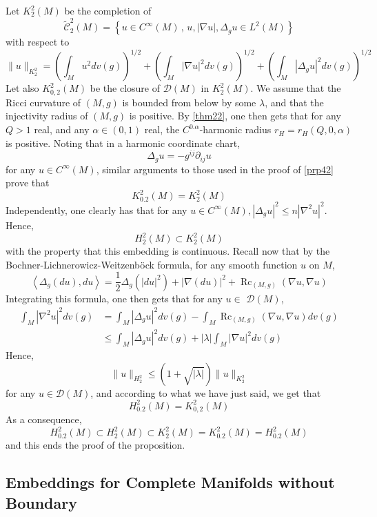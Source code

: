 \documentclass[12pt,hyperref,a4paper,UTF8]{ctexart}
\begin{document}
\begin{Proof}
Let $K_2^2(M)$ be the completion of
$$
\tilde{\mathcal{C}}_2^2(M)=\left\{u \in C^{\infty}(M) \,,\, u,|\nabla u|, \Delta_g u \in L^2(M)\right\}
$$
with respect to
$$
\|u\|_{K_2^2}=\left(\int_M u^2 d v(g)\right)^{1 / 2}+\left(\int_M|\nabla u|^2 d v(g)\right)^{1 / 2}+\left(\int_M\left|\Delta_g u\right|^2 d v(g)\right)^{1 / 2}
$$
Let also $K_{0,2}^2(M)$ be the closure of $\mathcal{D}(M)$ in $K_2^2(M)$. We assume that the Ricci curvature of $(M, g)$ is bounded from below by some $\lambda$, and that the injectivity radius of $(M, g)$ is positive. By \autoref{thm22}, one then gets that for any $Q>1$ real, and any $\alpha \in(0,1)$ real, the $C^{0 . \alpha}$-harmonic radius $r_H=r_H(Q, 0, \alpha)$ is positive. Noting that in a harmonic coordinate chart,
$$
\Delta_g u=-g^{i j} \partial_{i j} u
$$
for any $u \in C^{\infty}(M)$, similar arguments to those used in the proof of \autoref{prp42} prove that
$$
K_{0.2}^2(M)=K_2^2(M)
$$
Independently, one clearly has that for any $u \in C^{\infty}(M),\left|\Delta_g u\right|^2 \leq n\left|\nabla^2 u\right|^2$. Hence,
$$
H_2^2(M) \subset K_2^2(M)
$$
with the property that this embedding is continuous. Recall now that by the Bochner-Lichnerowicz-Weitzenböck formula, for any smooth function $u$ on $M$,
$$
\left\langle\Delta_g(d u), d u\right\rangle=\frac{1}{2} \Delta_g\left(|d u|^2\right)+|\nabla(d u)|^2+\operatorname{Rc}_{(M, g)}(\nabla u, \nabla u)
$$
Integrating this formula, one then gets that for any $u \in$ $\mathcal{D}(M)$,
$$
\begin{aligned}
\int_M\left|\nabla^2 u\right|^2 d v(g) & =\int_M\left|\Delta_g u\right|^2 d v(g)-\int_M \operatorname{Rc}_{(M, g)}(\nabla u, \nabla u) d v(g) \\
& \leq \int_M\left|\Delta_g u\right|^2 d v(g)+|\lambda| \int_M|\nabla u|^2 d v(g)
\end{aligned}
$$
Hence,
$$
\|u\|_{H_2^2} \leq(1+\sqrt{|\lambda|})\|u\|_{K_2^2}
$$
for any $u \in \mathcal{D}(M)$, and according to what we have just said, we get that
$$
H_{0.2}^2(M)=K_{0,2}^2(M)
$$
As a consequence,
$$
H_{0.2}^2(M) \subset H_2^2(M) \subset K_2^2(M)=K_{0.2}^2(M)=H_{0.2}^2(M)
$$
and this ends the proof of the proposition.
\end{Proof}

\subsection{Embeddings for Complete Manifolds without Boundary} 
\end{document}
